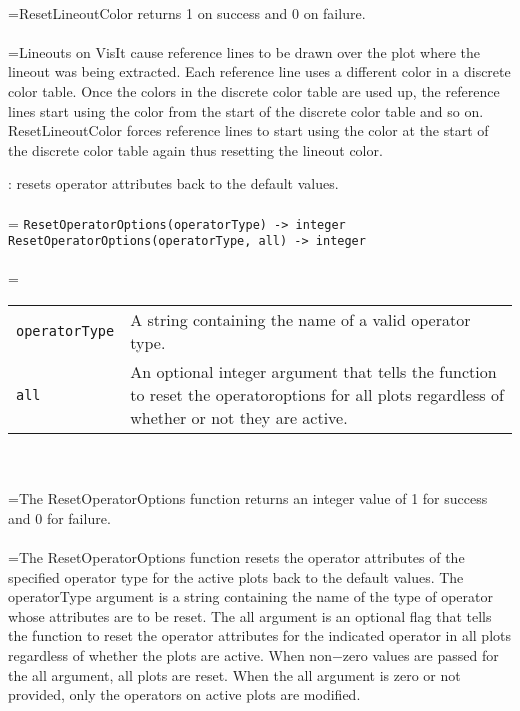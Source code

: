 \documentclass[10pt,a4paper]{report}
\begin{document}
 \\ 
\hangindent=\parindent ResetLineoutColor returns 1 on success and 0 on failure. \\[-3mm] 

 \\ 
\hangindent=\parindent Lineouts on VisIt cause reference lines to be drawn over the plot where the lineout was being extracted. Each reference line uses a different color in a discrete color table. Once the colors in the discrete color table are used up, the reference lines start using the color from the start of the discrete color table and so on. ResetLineoutColor forces reference lines to start using the color at the start of the discrete color table again thus resetting the lineout color. \\[-3mm] 

\newpage


{}
: resets operator attributes back to the default values.\\[-3mm]

 \\ 
\hangindent=\parindent 
\verb!ResetOperatorOptions(operatorType) -> integer!\\ 
\verb!ResetOperatorOptions(operatorType, all) -> integer!\\ [-3mm]

 \\ 
\hangindent=\parindent 
\begin{tabular}{lp{9cm}}
\verb!operatorType! & A string containing the name of a valid operator type. \\
\verb!all! & An optional integer argument that tells the function to reset the operatoroptions for all plots regardless of whether or not they are active. \\
\end{tabular} \\[-2mm]


 \\ 
\hangindent=\parindent The ResetOperatorOptions function returns an integer value of 1 for success and 0 for failure. \\[-3mm] 

 \\ 
\hangindent=\parindent The ResetOperatorOptions function resets the operator attributes of the specified operator type for the active plots back to the default values. The operatorType argument is a string containing the name of the type of operator whose attributes are to be reset. The all argument is an optional flag that tells the function to reset the operator attributes for the indicated operator in all plots regardless of whether the plots are active. When non$-$zero values are passed for the all argument, all plots are reset. When the all argument is zero or not provided, only the operators on active plots are modified. \\[-3mm] 
\end{document}

